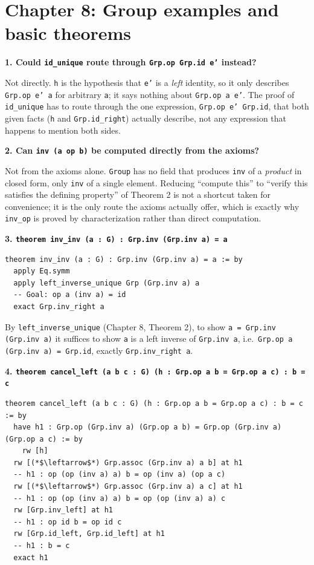 \section{Chapter 8: Group examples and basic theorems}\label{sec:15-appendix-solutions:08-chapter-8:1}

\textbf{1. Could \texttt{id\_\allowbreak{}unique} route through \texttt{Grp.op Grp.id e'} instead?}

Not directly. \texttt{h} is the hypothesis that \texttt{e'} is a \emph{left} identity, so it only describes \texttt{Grp.op e' a} for arbitrary \texttt{a}; it says nothing about \texttt{Grp.op a e'}. The proof of \texttt{id\_\allowbreak{}unique} has to route through the one expression, \texttt{Grp.op e' Grp.id}, that both given facts (\texttt{h} and \texttt{Grp.id\_\allowbreak{}right}) actually describe, not any expression that happens to mention both sides.

\textbf{2. Can \texttt{inv (a op b)} be computed directly from the axioms?}

Not from the axioms alone. \texttt{Group} has no field that produces \texttt{inv} of a \emph{product} in closed form, only \texttt{inv} of a single element. Reducing ``compute this'' to ``verify this satisfies the defining property'' of Theorem 2 is not a shortcut taken for convenience; it is the only route the axioms actually offer, which is exactly why \texttt{inv\_\allowbreak{}op} is proved by characterization rather than direct computation.

\textbf{3. \texttt{theorem inv\_\allowbreak{}inv (a : G) : Grp.inv (Grp.inv a) = a}}

\begin{lstlisting}
theorem inv_inv (a : G) : Grp.inv (Grp.inv a) = a := by
  apply Eq.symm
  apply left_inverse_unique Grp (Grp.inv a) a
  -- Goal: op a (inv a) = id
  exact Grp.inv_right a
\end{lstlisting}

By \texttt{left\_\allowbreak{}inverse\_\allowbreak{}unique} (Chapter 8, Theorem 2), to show \texttt{a = Grp.inv (Grp.inv a)} it suffices to show \texttt{a} is a left inverse of \texttt{Grp.inv a}, i.e.~\texttt{Grp.op a (Grp.inv a) = Grp.id}, exactly \texttt{Grp.inv\_\allowbreak{}right a}.

\textbf{4. \texttt{theorem cancel\_\allowbreak{}left (a b c : G) (h : Grp.op a b = Grp.op a c) : b = c}}

\begin{lstlisting}
theorem cancel_left (a b c : G) (h : Grp.op a b = Grp.op a c) : b = c := by
  have h1 : Grp.op (Grp.inv a) (Grp.op a b) = Grp.op (Grp.inv a) (Grp.op a c) := by
    rw [h]
  rw [(*$\leftarrow$*) Grp.assoc (Grp.inv a) a b] at h1
  -- h1 : op (op (inv a) a) b = op (inv a) (op a c)
  rw [(*$\leftarrow$*) Grp.assoc (Grp.inv a) a c] at h1
  -- h1 : op (op (inv a) a) b = op (op (inv a) a) c
  rw [Grp.inv_left] at h1
  -- h1 : op id b = op id c
  rw [Grp.id_left, Grp.id_left] at h1
  -- h1 : b = c
  exact h1
\end{lstlisting}

